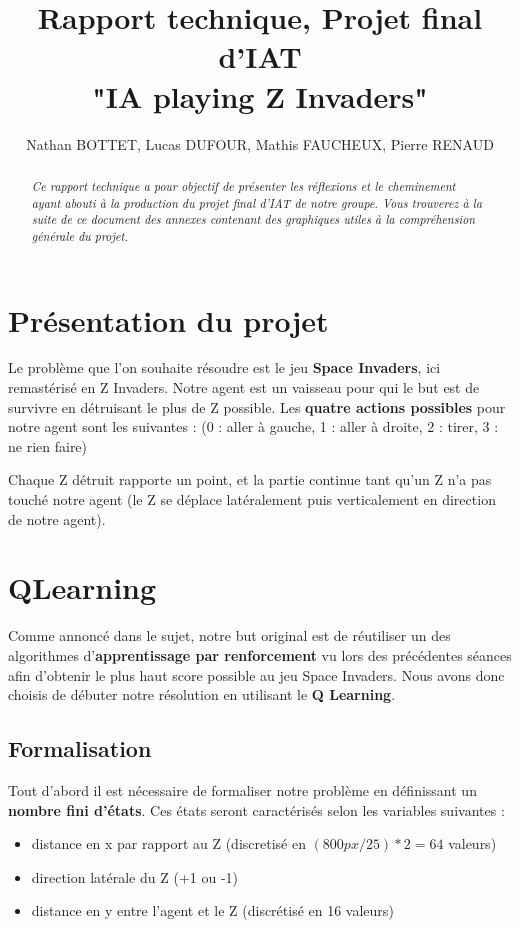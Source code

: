 \documentclass[12pt]{article}
\title{Rapport technique, Projet final d'IAT \\ \fontsize{13pt}{13pt}\selectfont "IA playing Z Invaders"}
\author{Nathan BOTTET, Lucas DUFOUR, Mathis FAUCHEUX, Pierre RENAUD}
\begin{document}
\begin{titlepage}
\thispagestyle{empty}
\setcounter{page}{0}
\maketitle %

\begin{abstract}
\textit{Ce rapport technique a pour objectif de présenter les réflexions et le cheminement ayant abouti à la production du projet final d'IAT de notre groupe. Vous trouverez à la suite de ce document des annexes contenant des graphiques utiles à la compréhension générale du projet. }
\end{abstract}

\end{titlepage}
\begin{page}

\section{Présentation du projet}
Le problème que l’on souhaite résoudre est le jeu \textbf{Space Invaders}, ici remastérisé en Z Invaders. Notre agent est un vaisseau pour qui le but est de survivre en détruisant le plus de Z possible. Les \textbf{quatre actions possibles} pour notre agent sont les suivantes :
(0 : aller à gauche,
1 : aller à droite,
2 : tirer,
3 : ne rien faire)

Chaque Z détruit rapporte un point, et la partie continue tant qu'un Z n'a pas touché notre agent (le Z se déplace latéralement puis verticalement en direction de notre agent).

\section{QLearning}
Comme annoncé dans le sujet, notre but original est de réutiliser un des algorithmes d’\textbf{apprentissage par renforcement}
vu lors des précédentes séances afin d’obtenir le plus haut score possible au jeu Space Invaders. Nous avons donc choisis de débuter notre résolution en utilisant le \textbf{Q Learning}.

\subsection{Formalisation}
Tout d'abord il est nécessaire de formaliser notre problème en définissant un \textbf{nombre fini d'états}. Ces états seront caractérisés selon les variables suivantes :
\begin{itemize}
\item distance en x par rapport au Z (discretisé en $(800px/25) *2 = 64$ valeurs)
\item direction latérale du Z (+1 ou -1)
\item distance en y entre l'agent et le Z (discrétisé en 16 valeurs)
\end{itemize}


\end{page}
\end{document}
